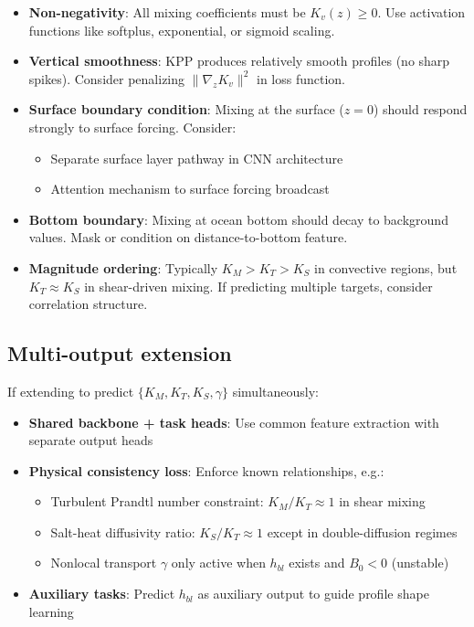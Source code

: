 \documentclass[11pt, a4paper]{article}
\begin{document}
\begin{itemize}
    \item \textbf{Non-negativity}: All mixing coefficients must be $K_v(z) \geq 0$. Use activation functions like softplus, exponential, or sigmoid scaling.

    \item \textbf{Vertical smoothness}: KPP produces relatively smooth profiles (no sharp spikes). Consider penalizing $\|\nabla_z K_v\|^2$ in loss function.

    \item \textbf{Surface boundary condition}: Mixing at the surface ($z=0$) should respond strongly to surface forcing. Consider:
    \begin{itemize}
        \item Separate surface layer pathway in CNN architecture
        \item Attention mechanism to surface forcing broadcast
    \end{itemize}

    \item \textbf{Bottom boundary}: Mixing at ocean bottom should decay to background values. Mask or condition on distance-to-bottom feature.

    \item \textbf{Magnitude ordering}: Typically $K_M > K_T > K_S$ in convective regions, but $K_T \approx K_S$ in shear-driven mixing. If predicting multiple targets, consider correlation structure.
\end{itemize}

\subsection{Multi-output extension}
\label{sec:multi_output}

If extending to predict $\{K_M, K_T, K_S, \gamma\}$ simultaneously:

\begin{itemize}
    \item \textbf{Shared backbone + task heads}: Use common feature extraction with separate output heads
    \item \textbf{Physical consistency loss}: Enforce known relationships, e.g.:
    \begin{itemize}
        \item Turbulent Prandtl number constraint: $K_M/K_T \approx 1$ in shear mixing
        \item Salt-heat diffusivity ratio: $K_S/K_T \approx 1$ except in double-diffusion regimes
        \item Nonlocal transport $\gamma$ only active when $h_{bl}$ exists and $B_0 < 0$ (unstable)
    \end{itemize}
    \item \textbf{Auxiliary tasks}: Predict $h_{bl}$ as auxiliary output to guide profile shape learning
\end{itemize}
\end{document}
